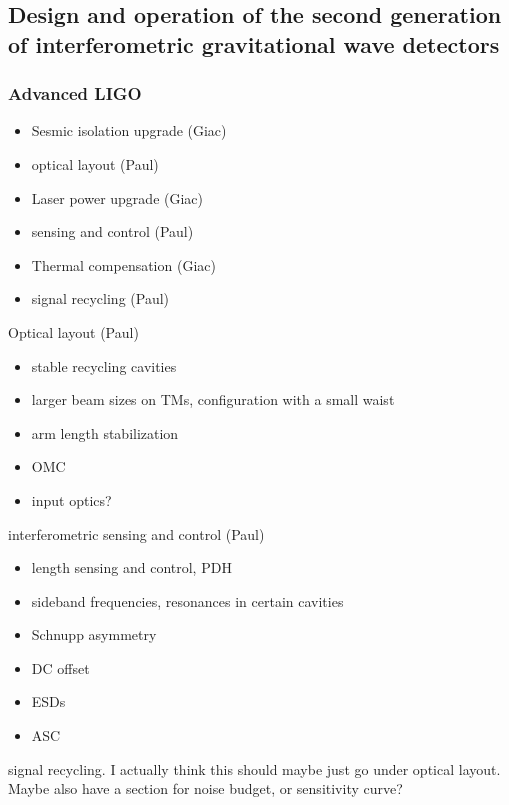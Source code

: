 \subsection{Design and operation of the second generation of interferometric gravitational wave detectors}\label{subsec:2ndgen}

\subsubsection{Advanced LIGO}
\begin{itemize}
\item Sesmic isolation upgrade (Giac)
\item optical layout (Paul)
\item Laser power upgrade (Giac)
\item sensing and control (Paul)
\item Thermal compensation (Giac)
\item signal recycling (Paul)
\end{itemize}

Optical layout (Paul)

\begin{itemize}
\item stable recycling cavities
\item larger beam sizes on TMs, configuration with a small waist
\item arm length stabilization
\item OMC
\item input optics?
\end{itemize}

interferometric sensing and control (Paul)

\begin{itemize}
\item length sensing and control, PDH
\item sideband frequencies, resonances in certain cavities
\item Schnupp asymmetry
\item DC offset
\item ESDs
\item ASC
\end{itemize}

signal recycling. I actually think this should maybe just go under optical layout.
Maybe also have a section for noise budget, or sensitivity curve?








